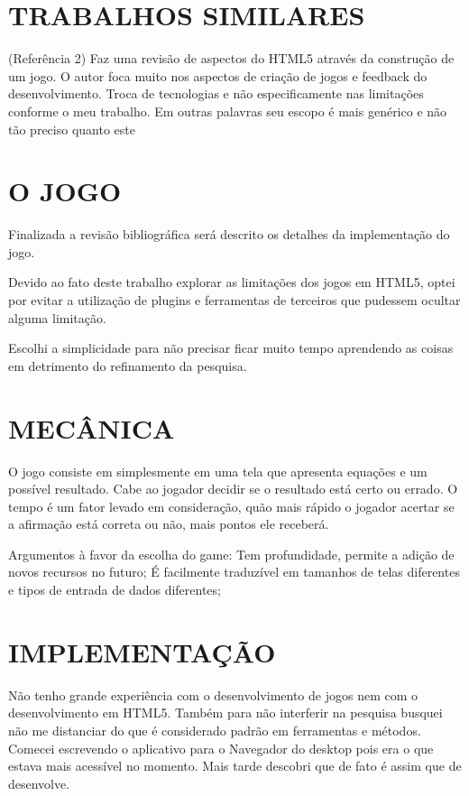 \documentclass[
12pt,
a4paper,
portuges,
draft
]{report}
\begin{document}
\section{TRABALHOS SIMILARES}

(Referência 2) Faz uma revisão de aspectos do HTML5 através da
construção de um jogo. O autor foca muito nos aspectos de criação
de jogos e feedback do desenvolvimento. Troca de tecnologias e não
especificamente nas limitações conforme o meu trabalho. Em outras
palavras seu escopo é mais genérico e não tão preciso quanto este


\section{O JOGO}
Finalizada a revisão bibliográfica será descrito os detalhes da implementação do jogo.

Devido ao fato deste trabalho explorar as limitações dos jogos em
HTML5, optei por evitar a utilização de plugins e ferramentas de
terceiros que pudessem ocultar alguma limitação.

Escolhi a simplicidade para não precisar ficar muito tempo aprendendo
as coisas em detrimento do refinamento da pesquisa.

\section{MECÂNICA}

O jogo consiste em simplesmente em uma tela que apresenta equações e
um possível resultado. Cabe ao jogador decidir se o resultado está
certo ou errado. O tempo é um fator levado em consideração, quão
mais rápido o jogador acertar se a afirmação está correta ou não,
mais pontos ele receberá.

Argumentos à favor da escolha do game: Tem profundidade, permite a
adição de novos recursos no futuro;
É facilmente traduzível em tamanhos de telas diferentes e tipos de
entrada de dados diferentes;

\section{IMPLEMENTAÇÃO}

Não tenho grande experiência com o desenvolvimento de jogos nem com
o desenvolvimento em HTML5. Também para não interferir na pesquisa
busquei não me distanciar do que é considerado padrão em ferramentas
e métodos.
Comecei escrevendo o aplicativo para o Navegador do desktop pois era o
que estava mais acessível no momento. Mais tarde descobri que de fato
é assim que de desenvolve.
\end{document}
